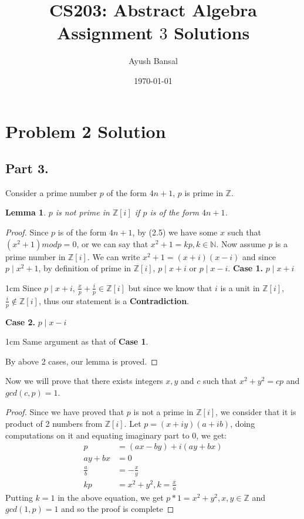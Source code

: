 \documentclass{article}
\title{\vspace{80mm}\lightgreyb CS203: Abstract Algebra \\
\lightgreyb Assignment $3$ Solutions}
\author{Ayush Bansal}
\date{\today}
\newtheorem{lemma}{Lemma}
\newenvironment{myenv}{\begin{adjustwidth}{1cm}{}}{\end{adjustwidth}}
\begin{document}
\setcounter{page}{4}
\setcounter{section}{1}
\setcounter{lemma}{3}
\section{Problem 2 Solution}{
  \setcounter{subsection}{2}
  \setcounter{equation}{5}
  \subsection{Part 3.}{
    Consider a prime number $p$ of the form $4n+1$, $p$ is prime in $\mathbb{Z}$.
    \begin{lemma}
      $p$ is not prime in $\mathbb{Z}[i]$ if $p$ is of the form $4n+1$.
    \end{lemma}
    \begin{proof}
    Since $p$ is of the form $4n+1$, by (2.5) we have some $x$ such that $(x^2+1)modp=0$, or we can say that $x^2+1=kp,k \in \mathbb{N}$. \newline
    Now assume $p$ is a prime number in $\mathbb{Z}[i]$. \newline
    We can write $x^2+1=(x+i)(x-i)$ and since $p \mid x^2+1$, by definition of prime in $\mathbb{Z}[i]$, $p \mid x+i$ or $p \mid x-i$. \newline
    \textbf{Case 1.} $p \mid x+i$
    \begin{myenv}
      Since $p \mid x+i$, $\frac{x}{p}+\frac{i}{p} \in \mathbb{Z}[i]$ but since we know that $i$ is a unit in $\mathbb{Z}[i]$, $\frac{i}{p} \notin \mathbb{Z}[i]$, thus our statement is a \textbf{Contradiction}.
    \end{myenv}
    \textbf{Case 2.} $p \mid x-i$
    \begin{myenv}
      Same argument as that of \textbf{Case 1}.
    \end{myenv}
    By above 2 cases, our lemma is proved.
    \end{proof}
    Now we will prove that there exists integers $x,y$ and $c$ such that $x^2+y^2=cp$ and $gcd(c,p)=1$.
    \begin{proof}
      Since we have proved that $p$ is not a prime in $\mathbb{Z}[i]$, we consider that it is product of 2 numbers from $\mathbb{Z}[i]$. \newline
      Let $p=(x+iy)(a+ib)$, doing computations on it and equating imaginary part to $0$, we get:
      \begin{align}
        p&=(ax-by)+i(ay+bx) \label{eq:6} \\
        ay+bx&=0 \\
        \frac{a}{b}&=-\frac{x}{y} \\
        kp&=x^2+y^2, k=\frac{x}{a}
      \end{align}
      Putting $k=1$ in the above equation, we get $p*1=x^2+y^2, x,y \in \mathbb{Z}$ and $gcd(1,p)=1$ and so the proof is complete
    \end{proof}
  }
}
\end{document}
